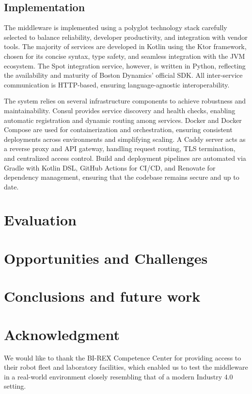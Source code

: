 \documentclass[conference]{IEEEtran}
\begin{document}
\subsection{Implementation}
The middleware is implemented using a polyglot technology stack carefully selected to 
 balance reliability, developer productivity, and integration with vendor tools. 
% 
The majority of services are developed in Kotlin using the Ktor framework, 
 chosen for its concise syntax, type safety, and seamless integration with the JVM ecosystem. 
% 
The Spot integration service, however, is written in Python, reflecting the availability 
 and maturity of Boston Dynamics' official SDK. 
% 
All inter-service communication is HTTP-based, ensuring language-agnostic interoperability.

The system relies on several infrastructure components to achieve robustness and maintainability. 
%
Consul provides service discovery and health checks, 
 enabling automatic registration and dynamic routing among services. 
% 
Docker and Docker Compose are used for containerization and orchestration, 
 ensuring consistent deployments across environments and simplifying scaling. 
% 
A Caddy server acts as a reverse proxy and API gateway, 
 handling request routing, TLS termination, and centralized access control. 
% 
Build and deployment pipelines are automated via Gradle with Kotlin DSL, GitHub Actions for CI/CD, 
 and Renovate for dependency management, ensuring that the codebase remains secure and up to date.


\section{Evaluation}\label{sec:eval}
\clearpage

\section{Opportunities and Challenges}\label{sec:impact}
\newpage
\section{Conclusions and future work}\label{sec:future}

\section*{Acknowledgment}
We would like to thank the BI-REX Competence Center for providing access to their robot fleet and 
 laboratory facilities, which enabled us to test the middleware in a real-world environment closely 
  resembling that of a modern Industry 4.0 setting.




\end{document}

